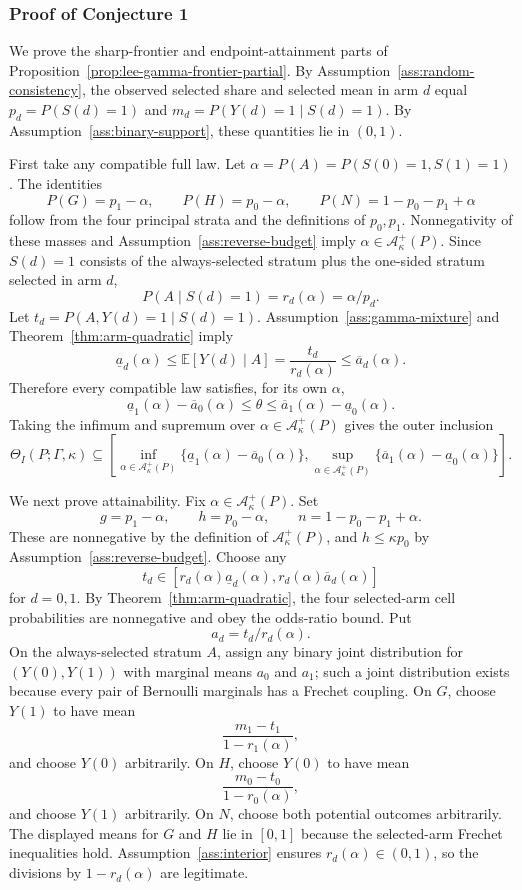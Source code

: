 \documentclass[11pt]{article}
\newcommand{\E}{\mathbb{E}}
\theoremstyle{definition}
\theoremstyle{plain}
\theoremstyle{remark}
\begin{document}
\subsubsection*{Proof of Conjecture 1}
We prove the sharp-frontier and endpoint-attainment parts of
Proposition~\ref{prop:lee-gamma-frontier-partial}.  By
Assumption~\ref{ass:random-consistency}, the observed selected share and
selected mean in arm \(d\) equal \(p_d=P(S(d)=1)\) and
\(m_d=P(Y(d)=1\mid S(d)=1)\).  By Assumption~\ref{ass:binary-support}, these
quantities lie in \((0,1)\).

First take any compatible full law.  Let
\(\alpha=P(A)=P(S(0)=1,S(1)=1)\).  The identities
\[
  P(G)=p_1-\alpha,\qquad P(H)=p_0-\alpha,\qquad P(N)=1-p_0-p_1+\alpha
\]
follow from the four principal strata and the definitions of \(p_0,p_1\).
Nonnegativity of these masses and Assumption~\ref{ass:reverse-budget} imply
\(\alpha\in\mathcal A_\kappa^+(P)\).  Since \(S(d)=1\) consists of the
always-selected stratum plus the one-sided stratum selected in arm \(d\),
\[
  P(A\mid S(d)=1)=r_d(\alpha)=\alpha/p_d .
\]
Let \(t_d=P(A,Y(d)=1\mid S(d)=1)\).  Assumption~\ref{ass:gamma-mixture} and
Theorem~\ref{thm:arm-quadratic} imply
\[
  \underline a_d(\alpha)\le
  \E[Y(d)\mid A]=\frac{t_d}{r_d(\alpha)}
  \le \overline a_d(\alpha).
\]
Therefore every compatible law satisfies, for its own \(\alpha\),
\[
  \underline a_1(\alpha)-\overline a_0(\alpha)
  \le
  \theta
  \le
  \overline a_1(\alpha)-\underline a_0(\alpha).
\]
Taking the infimum and supremum over
\(\alpha\in\mathcal A_\kappa^+(P)\) gives the outer inclusion
\[
  \Theta_I(P;\Gamma,\kappa)
  \subseteq
  \left[
    \inf_{\alpha\in\mathcal A_\kappa^+(P)}
      \{\underline a_1(\alpha)-\overline a_0(\alpha)\},
    \sup_{\alpha\in\mathcal A_\kappa^+(P)}
      \{\overline a_1(\alpha)-\underline a_0(\alpha)\}
  \right].
\]

We next prove attainability.  Fix \(\alpha\in\mathcal A_\kappa^+(P)\).  Set
\[
  g=p_1-\alpha,\qquad h=p_0-\alpha,\qquad n=1-p_0-p_1+\alpha .
\]
These are nonnegative by the definition of \(\mathcal A_\kappa^+(P)\), and
\(h\le \kappa p_0\) by Assumption~\ref{ass:reverse-budget}.  Choose any
\[
  t_d\in
  [r_d(\alpha)\underline a_d(\alpha),
   r_d(\alpha)\overline a_d(\alpha)]
\]
for \(d=0,1\).  By Theorem~\ref{thm:arm-quadratic}, the four selected-arm cell
probabilities are nonnegative and obey the odds-ratio bound.  Put
\[
  a_d=t_d/r_d(\alpha).
\]
On the always-selected stratum \(A\), assign any binary joint distribution for
\((Y(0),Y(1))\) with marginal means \(a_0\) and \(a_1\); such a joint
distribution exists because every pair of Bernoulli marginals has a Frechet
coupling.  On \(G\), choose \(Y(1)\) to have mean
\[
  \frac{m_1-t_1}{1-r_1(\alpha)},
\]
and choose \(Y(0)\) arbitrarily.  On \(H\), choose \(Y(0)\) to have mean
\[
  \frac{m_0-t_0}{1-r_0(\alpha)},
\]
and choose \(Y(1)\) arbitrarily.  On \(N\), choose both potential outcomes
arbitrarily.  The displayed means for \(G\) and \(H\) lie in \([0,1]\) because
the selected-arm Frechet inequalities hold.  Assumption~\ref{ass:interior}
ensures \(r_d(\alpha)\in(0,1)\), so the divisions by
\(1-r_d(\alpha)\) are legitimate.
\end{document}
